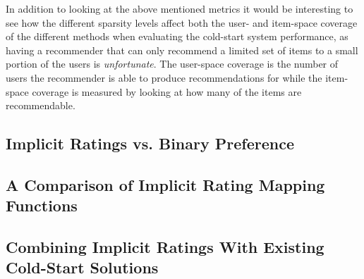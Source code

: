 

In addition to looking at the above mentioned metrics it would be interesting to see how
the different sparsity levels affect both the user- and item-space coverage of the different
methods when evaluating the cold-start system performance, as having a recommender that can only
recommend a limited set of items to a small portion of the users is \emph{unfortunate}. The
user-space coverage is the number of users the recommender is able to produce recommendations for while the item-space
coverage is measured by looking at how many of the items are recommendable.


\subsection{Implicit Ratings vs. Binary Preference}
\subsection{A Comparison of Implicit Rating Mapping Functions}
\subsection{Combining Implicit Ratings With Existing Cold-Start Solutions}


